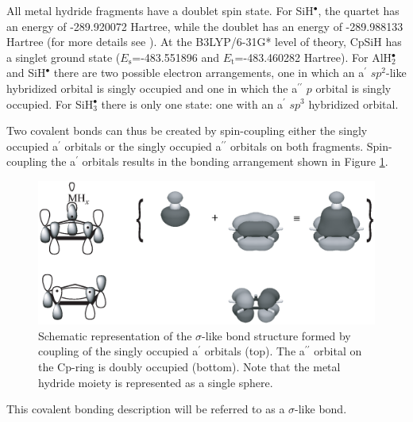 All metal hydride fragments have a doublet spin state. For SiH$^\bullet$, the quartet has an energy of \mbox{-289.920072} Hartree, while the doublet has an energy of \mbox{-289.988133} Hartree (for more details see \cite{kalemos}). At the B3LYP/6-31G* level of theory, CpSiH has a singlet ground state ($E_\mathrm{s}$=\mbox{-483.551896} and $E_\mathrm{t}$=\mbox{-483.460282} Hartree). For AlH$_2^\bullet$ and SiH$^\bullet$ there are two possible electron arrangements, one in which an a$^\prime$ $sp^2$-like hybridized orbital is singly occupied and one in which the a$^{\prime\prime}$ $p$ orbital is singly occupied. For SiH$_3^\bullet$ there is only one state: one with an a$^\prime$ $sp^3$ hybridized orbital. 

Two covalent bonds can thus be created by spin-coupling either the singly occupied a$^\prime$ orbitals or the singly occupied a$^{\prime\prime}$ orbitals on both fragments. Spin-coupling the a$^\prime$ orbitals results in the bonding arrangement shown in Figure \ref{ch4.fig.sigma}.
\begin{figure}[htbp]
\center
\includegraphics[scale=0.45]{cyclopentadienyl/figures/sigma.eps}
\caption{Schematic representation of the $\sigma$-like bond structure formed by coupling of the singly occupied a$^\prime$ orbitals (top). The a$^{\prime\prime}$ orbital on the Cp-ring is doubly occupied (bottom). Note that the metal hydride moiety is represented as a single sphere.}
\label{ch4.fig.sigma}
\end{figure}
This covalent bonding description will be referred to as a $\sigma$-like bond.

